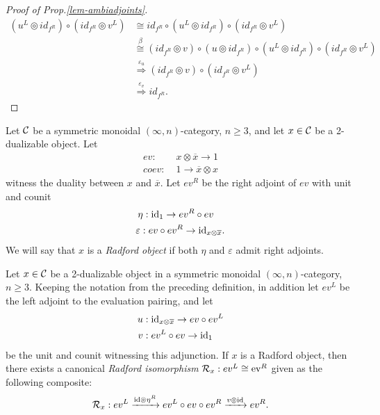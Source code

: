 \documentclass{amsart}
\begin{document}
\begin{proof}[Proof of Prop.\ref{lem-ambiadjoints}]
\begin{align*}
	(u^L \circledcirc id_{f^R}) \circ (id_{f^R} \circledcirc v^L) 
		& \cong  id_{f^R} \circ (u^L \circledcirc id_{f^R}) \circ (id_{f^R} \circledcirc v^L)  \\
		& \stackrel{\beta}{\cong}  (id_{f^R} \circledcirc v) \circ (u \circledcirc id_{f^R} )  \circ (u^L \circledcirc id_{f^R}) \circ (id_{f^R} \circledcirc v^L) \\
		& \stackrel{\varepsilon_u }{\Rightarrow} (id_{f^R} \circledcirc v) \circ (id_{f^R} \circledcirc v^L) \\
		& \stackrel{\varepsilon_v }{\Rightarrow} id_{f^R}.
\end{align*}
\end{proof}

\begin{definition} \label{def:Radford-Object}
	Let $\mathcal C$ be a symmetric monoidal $(\infty,n)$-category, $n \geq 3$, and let $x \in \mathcal C$ be a 2-dualizable object. Let
	\begin{align*}
		ev: & \; x \otimes \overline{x} \to 1 \\
		coev: & \;  1 \to  \overline{x} \otimes x
	\end{align*}
	 witness the duality between $x$ and $\overline{x}$. Let $ev^R$ be the right adjoint of $ev$ with unit and counit
	\begin{align*}
		\eta: & \;  \mathrm{id}_1 \to ev^R \circ ev \\
		\varepsilon: \; & ev \circ ev^R \to \mathrm{id}_{x \otimes \overline{x}}. 
	\end{align*}
	We will say that $x$ is a {\em Radford object} if both $\eta$ and $\varepsilon$ admit right adjoints. 
\end{definition} 

\begin{proposition} \label{prop-Cat_Radford}
	Let $x \in \mathcal C$ be a 2-dualizable object in a symmetric monoidal $(\infty,n)$-category, $n \geq 3$. Keeping the notation from the preceding definition, in addition let $ev^L$ be the left adjoint to the evaluation pairing, and let
	\begin{align*}
		u: & \;  \mathrm{id}_{x \otimes \overline{x}} \to ev \circ ev^L \\
		v: & \; ev^L \circ ev \to \mathrm{id}_1
	\end{align*} 
	be the unit and counit witnessing this adjunction. If $x$ is a Radford object, then there exists a canonical {\em Radford isomorphism} $\mathcal R_x: ev^L \cong \mathrm{ev}^R$ given as the following composite:
	\begin{equation*}
		\mathcal R_x: ev^L \xrightarrow{\mathrm{id} \circledcirc \eta^R} ev^L \circ ev \circ ev^R \xrightarrow{v \circledcirc \mathrm{id}} ev^R.
	\end{equation*}
\end{proposition}
\end{document}
